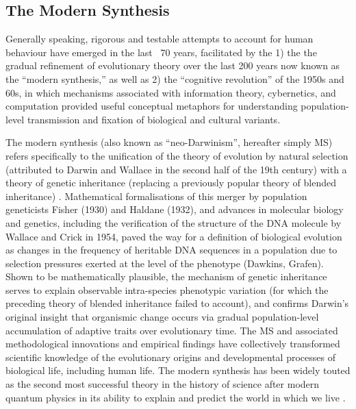 
\subsection{The Modern Synthesis}
Generally speaking, rigorous and testable attempts to account for human behaviour have emerged in the last ~70 years, facilitated by the 1) the the gradual refinement of evolutionary theory over the last 200 years now known as the ``modern synthesis,'' as well as 2) the ``cognitive revolution'' of the 1950s and 60s, in which mechanisms associated with information theory, cybernetics, and computation provided useful conceptual metaphors for understanding population-level transmission and fixation of biological and cultural variants.

The modern synthesis (also known as ``neo-Darwinism'', hereafter simply MS) refers specifically to the unification of the theory of evolution by natural selection (attributed to Darwin and Wallace in the second half of the 19th century) with a theory of genetic inheritance (replacing a previously popular theory of blended inheritance) \citep{Huxley1942}.  Mathematical formalisations of this merger by population geneticists Fisher (1930) and Haldane (1932), and advances in molecular biology and genetics, including the verification of the structure of the DNA molecule by Wallace and Crick in 1954, paved the way for a definition of biological evolution as changes in the frequency of heritable DNA sequences in a population due to selection pressures exerted at the level of the phenotype (Dawkins, Grafen).  Shown to be mathematically plausible, the mechanism of genetic inheritance serves to explain observable intra-species phenotypic variation (for which the preceding theory of blended inheritance failed to account), and confirms Darwin's original insight that organismic change occurs via gradual population-level accumulation of adaptive traits over evolutionary time. The MS and associated methodological innovations and empirical findings have collectively transformed scientific knowledge of the evolutionary origins and developmental processes of biological life, including human life. The modern synthesis has been widely touted as the second most successful theory in the history of science after modern quantum physics in its ability to explain and predict the world in which we live \citep{Dunbar1996}.

